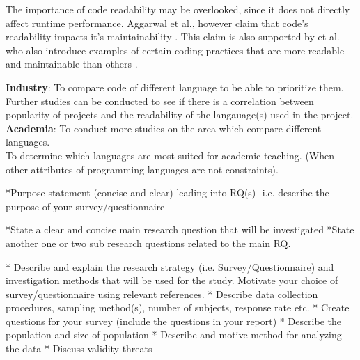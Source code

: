 \documentclass[times, 10pt,twocolumn]{IEEEtran}
\begin{document}
The importance of code readability may be overlooked, since it does not directly affect runtime performance. Aggarwal et al., however claim that code's readability impacts it's maintainability \cite{aggarwal2002integrated}. This claim is also supported by \cite{elshoff1982improving} et al. who also introduce examples of certain coding practices that are more readable and maintainable than others \cite{elshoff1982improving}.
\newline




\textbf{Industry}: To compare code of different language to be able to prioritize them. \\
Further studies can be conducted to see if there is a correlation between popularity of projects and the readability of the langauage(s) used in the project. \\
\textbf{Academia}: To conduct more studies on the area which compare different languages. \\
To determine which languages are most suited for academic teaching. (When other attributes of programming languages are not constraints).



*Purpose statement (concise  and clear)  leading into  RQ(s)
 -i.e.  describe  the purpose of  your  survey/questionnaire

*State a clear and concise main  research  question  that  will  be  investigated
*State another one or  two sub research  questions related to  the main  RQ.



* Describe  and explain the research  strategy (i.e.  Survey/Questionnaire)
and investigation methods that  will  be  used  for the study.  Motivate  your  
choice  of  survey/questionnaire  using relevant  references.
* Describe  data  collection  procedures, sampling  method(s),  number  of  
subjects, response  rate  etc.
* Create  questions for your  survey  (include  the questions in  your  report)
* Describe  the population  and size  of  population
* Describe  and motive  method  for analyzing the data
* Discuss validity  threats





\end{document}
